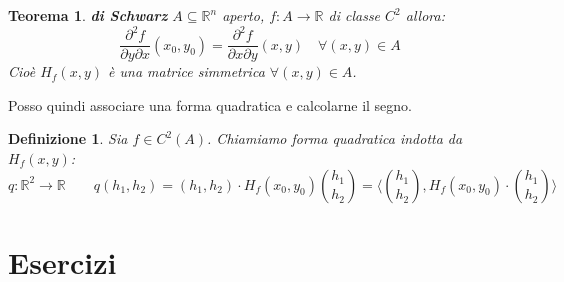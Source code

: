\documentclass{scrreprt}
\newtheorem{defn}{Definizione}
\newenvironment{definition}{\begin{mdframed}[backgroundcolor=Ivory2]\begin{defn}}{\end{defn}\end{mdframed}}
\newtheorem{teorema}{Teorema}
\newenvironment{thm}{\begin{mdframed}[backgroundcolor=Ivory2]\begin{teorema}}{\end{teorema}\end{mdframed}}
\begin{document}
\begin{thm} \textbf{di Schwarz}
	$A \subseteq \mathbb{R}^n$ aperto, $f: A \to \mathbb{R}$ di classe $C^2$ allora:
	\begin{equation}
		\frac{\partial^2 f}{\partial y \partial x} (x_0, y_0) = \frac{\partial^2 f}{\partial x \partial y} (x, y) \quad \forall (x,y) \in A
	\end{equation}
	Cioè $H_f(x,y)$ è una matrice simmetrica $\forall (x,y) \in A$.
\end{thm}
Posso quindi associare una forma quadratica e calcolarne il segno.

\begin{definition}
	Sia $f \in C^2(A)$. Chiamiamo forma quadratica indotta da $H_f(x,y)$:
	\begin{equation}
		q: \mathbb{R}^2 \to \mathbb{R} \quad \quad q(h_1,h_2) = (h_1, h_2) \cdot H_f(x_0,y_0) \binom{h_1}{h_2} = \langle \binom{h_1}{h_2}, H_f(x_0,y_0) \cdot \binom{h_1}{h_2} \rangle %
	\end{equation}
%
%
\end{definition}



\chapter{Esercizi}
\end{document}
